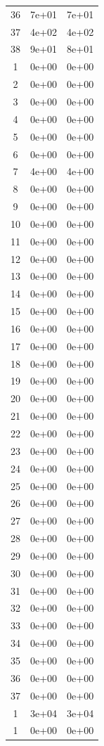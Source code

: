 \documentclass[
  10pt,
]{article}
\begin{document}
\begin{longtable}[]{@{}ccc@{}}
36 & 7e+01 & 7e+01 \\
37 & 4e+02 & 4e+02 \\
38 & 9e+01 & 8e+01 \\
1 & 0e+00 & 0e+00 \\
2 & 0e+00 & 0e+00 \\
3 & 0e+00 & 0e+00 \\
4 & 0e+00 & 0e+00 \\
5 & 0e+00 & 0e+00 \\
6 & 0e+00 & 0e+00 \\
7 & 4e+00 & 4e+00 \\
8 & 0e+00 & 0e+00 \\
9 & 0e+00 & 0e+00 \\
10 & 0e+00 & 0e+00 \\
11 & 0e+00 & 0e+00 \\
12 & 0e+00 & 0e+00 \\
13 & 0e+00 & 0e+00 \\
14 & 0e+00 & 0e+00 \\
15 & 0e+00 & 0e+00 \\
16 & 0e+00 & 0e+00 \\
17 & 0e+00 & 0e+00 \\
18 & 0e+00 & 0e+00 \\
19 & 0e+00 & 0e+00 \\
20 & 0e+00 & 0e+00 \\
21 & 0e+00 & 0e+00 \\
22 & 0e+00 & 0e+00 \\
23 & 0e+00 & 0e+00 \\
24 & 0e+00 & 0e+00 \\
25 & 0e+00 & 0e+00 \\
26 & 0e+00 & 0e+00 \\
27 & 0e+00 & 0e+00 \\
28 & 0e+00 & 0e+00 \\
29 & 0e+00 & 0e+00 \\
30 & 0e+00 & 0e+00 \\
31 & 0e+00 & 0e+00 \\
32 & 0e+00 & 0e+00 \\
33 & 0e+00 & 0e+00 \\
34 & 0e+00 & 0e+00 \\
35 & 0e+00 & 0e+00 \\
36 & 0e+00 & 0e+00 \\
37 & 0e+00 & 0e+00 \\
1 & 3e+04 & 3e+04 \\
1 & 0e+00 & 0e+00 \\
\end{longtable}
\end{document}
